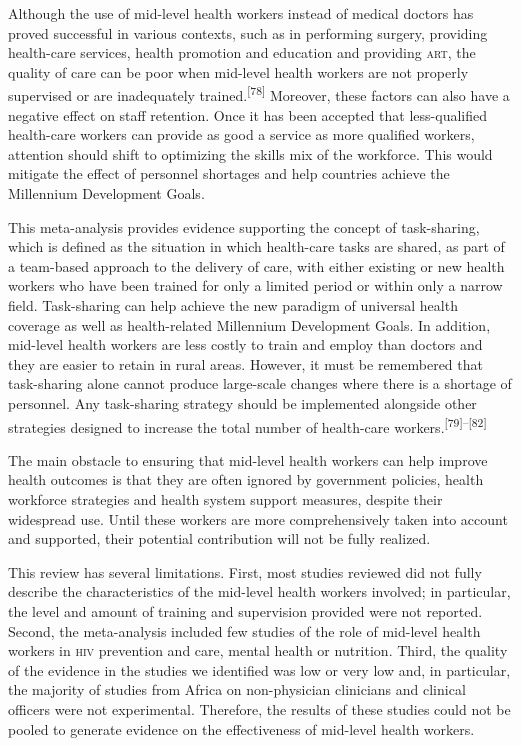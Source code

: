\documentclass{article}
\begin{document}
Although the use of mid-level health workers instead of medical doctors has
proved successful in
various contexts, such as in performing surgery, providing health-care services,
health promotion
and education and providing \textsc{art}, the quality of care can be poor when mid-level
health workers are
not properly supervised or are inadequately
trained.\textsuperscript{[}\textsuperscript{78}\textsuperscript{]}
Moreover, these factors can also have a negative effect on staff retention.
Once it has been accepted that less-qualified health-care workers can provide as
good a service as
more qualified workers, attention should shift to optimizing the skills mix of
the workforce. This
would mitigate the effect of personnel shortages and help countries achieve the
Millennium
Development Goals.

This meta-analysis provides evidence supporting the concept of task-sharing,
which is defined as
the situation in which health-care tasks are shared, as part of a team-based
approach to the
delivery of care, with either existing or new health workers who have been
trained for only a
limited period or within only a narrow field. Task-sharing can help achieve the
new paradigm of
universal health coverage as well as health-related Millennium Development
Goals. In addition,
mid-level health workers are less costly to train and employ than doctors and
they are easier to
retain in rural areas. However, it must be remembered that task-sharing alone
cannot produce
large-scale changes where there is a shortage of personnel. Any task-sharing
strategy should be
implemented alongside other strategies designed to increase the total number of
health-care
workers.\textsuperscript{[}\textsuperscript{79}\textsuperscript{]}\textsuperscript{–}\textsuperscript{[}\textsuperscript{82}\textsuperscript{]}

The main obstacle to ensuring that mid-level health workers can help improve
health outcomes is
that they are often ignored by government policies, health workforce strategies
and health system
support measures, despite their widespread use. Until these workers are more
comprehensively taken
into account and supported, their potential contribution will not be fully
realized.

This review has several limitations. First, most studies reviewed did not fully
describe the
characteristics of the mid-level health workers involved; in particular, the
level and amount of
training and supervision provided were not reported. Second, the meta-analysis
included few studies
of the role of mid-level health workers in \textsc{hiv} prevention and care, mental
health or nutrition.
Third, the quality of the evidence in the studies we identified was low or very
low and, in
particular, the majority of studies from Africa on non-physician clinicians and
clinical officers
were not experimental. Therefore, the results of these studies could not be
pooled to generate
evidence on the effectiveness of mid-level health workers.
\end{document}
